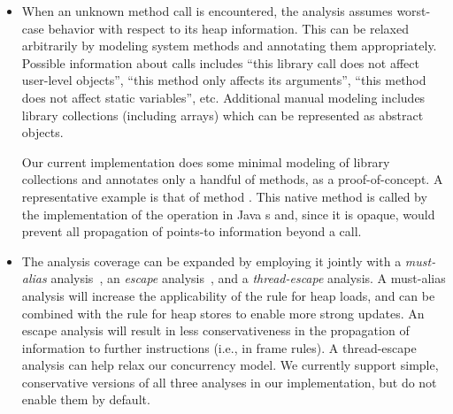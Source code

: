 \begin{itemize}
\item When an unknown method call is encountered, the analysis assumes worst-case behavior with respect to its heap information. This can be relaxed arbitrarily by modeling system methods and annotating them appropriately. Possible information about calls includes ``this library call does not affect user-level objects'', ``this method only affects its arguments'', ``this method does not affect static variables'', etc. Additional manual modeling includes library collections (including arrays) which can be represented as abstract objects.

Our current implementation does some minimal modeling of library collections and annotates only a handful of methods, as a proof-of-concept. A representative example is that of method . This native method is called by the implementation of the  operation in Java s and, since it is opaque, would prevent all propagation of points-to information beyond a  call.


\item The analysis coverage can be expanded by employing it jointly with a \emph{must-alias} analysis~\cite{popl:1998:Jagannathan,popl:1993:Choi,popl:2008:Zheng}, an \emph{escape} analysis~\cite{popl:1998:Blanchet,popl:1996:Deutsch}, and a \emph{thread-escape} analysis. A must-alias analysis will increase the applicability of the rule for heap loads, and can be combined with the rule for heap stores to enable more strong updates. An escape analysis will result in less conservativeness in the propagation of information to further instructions (i.e., in frame rules). A thread-escape analysis can help relax our concurrency model. We currently support simple, conservative versions of all three analyses in our implementation, but do not enable them by default.
\end{itemize}


